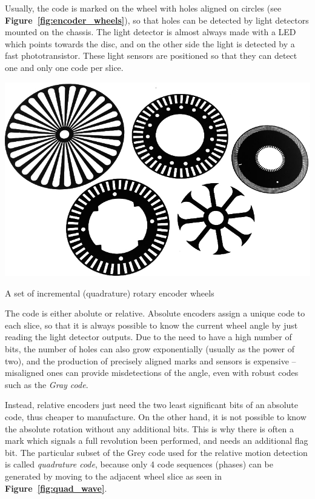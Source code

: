 \documentclass[a4paper,10pt]{article}
\makeatletter
\newenvironment{figurehere}{\def\@captype{figure}\vspace{2ex}}{\vspace{2ex}}
\newcommand{\citef}[1]{\textbf{Figure~\ref{#1}}}
\makeatother
\begin{document}
\begin{multicols}{2}
Usually, the code is marked on the wheel with holes aligned on circles (see
\citef{fig:encoder_wheels}), so that holes can be detected by light detectors
mounted on the chassis. The light detector is almost always made with a LED
which points towards the disc, and on the other side the light is detected by
a fast phototransistor. These light sensors are positioned so that they can
detect one and only one code per slice.

\begin{figurehere}
	\centering
	\includegraphics[keepaspectratio=true,width=0.9\columnwidth]{images/encoder_wheels.jpg}
	\caption{A set of incremental (quadrature) rotary encoder wheels}
	\label{fig:encoder_wheels}
\end{figurehere}

The code is either abolute or relative. Absolute encoders assign a unique code
to each slice, so that it is always possible to know the current wheel angle
by just reading the light detector outputs. Due to the need to have a high
number of bits, the number of holes can also grow exponentially (usually as
the power of two), and the production of precisely aligned marks and sensors
is expensive -- misaligned ones can provide misdetections of the angle, even
with robust codes such as the \emph{Gray code}.

Instead, relative encoders just need the two least significant bits of an
absolute code, thus cheaper to manufacture. On the other hand, it is not
possible to know the absolute rotation without any additional bits. This is
why there is often a mark which signals a full revolution been performed, and
needs an additional flag bit. The particular subset of the Grey code used for
the relative motion detection is called \emph{quadrature code}, because only 4
code sequences (phases) can be generated by moving to the adjacent wheel slice
as seen in \citef{fig:quad_wave}.


\end{multicols}
\end{document}

